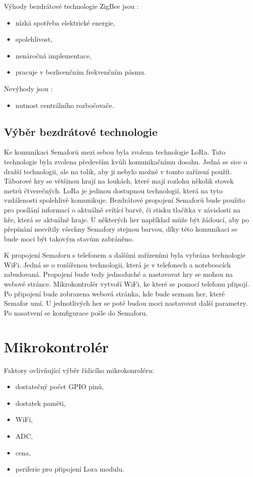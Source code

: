 Výhody bezdrátové technologie ZigBee jsou \cite{ZigBee_smart}:
\begin{itemize}
  \item nízká spotřeba elektrické energie,
  \item spolehlivost, 
  \item nenáročná implementace,
  \item pracuje v bezlicenčním frekvenčním pásmu. 
\end{itemize}

Nevýhody jsou \cite{ZigBee_smart}:
\begin{itemize}
  \item nutnost centrálního rozbočovače.
\end{itemize}



\subsection{Výběr bezdrátové technologie}
Ke komunikaci Semaforů mezi sebou byla zvolena technologie LoRa. Tato technologie byla zvolena především kvůli komunikačnímu dosahu. Jedná se sice o dražší technologii, 
ale na tolik, aby ji nebylo možné v tomto zařízení použít. Táborové hry se většinou hrají na loukách, které mají rozlohu několik stovek metrů čtverečných. LoRa je jedinou
dostupnou technologií, která na tyto vzdálenosti spolehlivě komunikuje. Bezdrátové propojení Semaforů bude použito pro posílání informací o aktuálně svítící barvě, či 
stisku tlačítka v závislosti na hře, která se aktuálně hraje. U některých her například může být žádoucí, aby po přepínání nesvítily všechny Semafory stejnou barvou,
díky této komunikaci se bude moci být takovým stavům zabráněno. 

K propojení Semaforu s telefonem a dalšími zařízeními byla vybrána technologie WiFi. Jedná se o rozšířenou technologii, která je v telefonech a noteboocích zabudovaná. 
Propojení bude tedy jednoduché a nastavovat hry se mohou na webové stránce. Mikrokontrolér vytvoří WiFi, ke které se pomocí telefonu připojí. Po připojení bude zobrazena
webová stránka, kde bude seznam her, které Semafor umí. U jednotlivých her se poté budou moci nastavovat další parametry. Po nasatvení se komfigurace pošle do Semaforu. 

\section{Mikrokontrolér}
Faktory ovlivňující výběr řídicího mikrokonroléru:
\begin{itemize}
  \item dostatečný počet GPIO pinů,
  \item dostatek paměti,
  \item WiFi,
  \item ADC,
  \item cena,
  \item periferie pro připojení Lora modulu.
\end{itemize}

